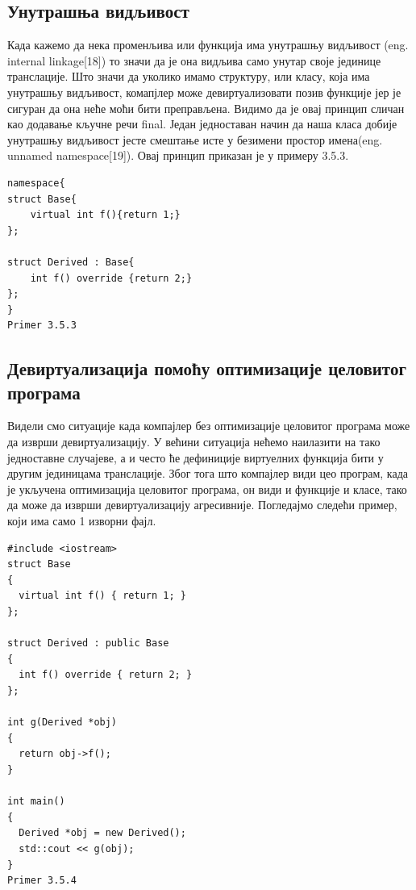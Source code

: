 \documentclass[12pt,oneside]{memoir}
\begin{document}
 \subsection{Унутрашња видљивост}
 Када кажемо да нека променљива или функција има унутрашњу видљивост
 (eng. internal linkage[18]) то значи да је она видљива само унутар своје јединице
 транслације.
 Што значи да уколико имамо структуру, или класу, која има унутрашњу видљивост,
 комапјлер може девиртуализовати позив функције јер је сигуран да она неће моћи бити
 преправљена.
 Видимо да је овај принцип сличан као додавање кључне речи  final.
 Један једноставан начин да наша класа добије унутрашњу видљивост јесте смештање исте
 у безимени простор имена(eng. unnamed namespace[19]).
 Овај принцип приказан је у примеру 3.5.3.
 
 \begin{lstlisting}
namespace{
struct Base{
    virtual int f(){return 1;}
};

struct Derived : Base{
    int f() override {return 2;}
};
}
Primer 3.5.3
\end{lstlisting}
 
\subsection{Девиртуализација помоћу оптимизације целовитог програма}
 
 Видели смо ситуације када компајлер без оптимизације целовитог програма може да
 изврши девиртуализацију.
 У већини ситуација нећемо наилазити на тако једноставне случајеве, а и често ће
 дефиниције виртуелних функција бити у другим јединицама транслације.
 Због тога што компајлер види цео програм, када је укључена оптимизација
 целовитог програма, он види и функције и класе, тако да може да изврши
 девиртуализацију агресивније.
 Погледајмо следећи пример, који има само 1 изворни фајл.
 \begin{lstlisting}
#include <iostream>
struct Base
{
  virtual int f() { return 1; }
};

struct Derived : public Base
{
  int f() override { return 2; }
};

int g(Derived *obj)
{
  return obj->f();
}

int main()
{
  Derived *obj = new Derived();
  std::cout << g(obj);
}
Primer 3.5.4
\end{lstlisting}
	
\end{document}
